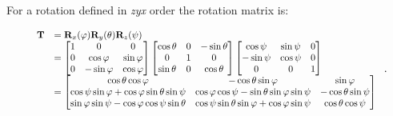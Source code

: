 \begin{enumerate}
        For a rotation defined in \textit{zyx} order the rotation matrix is:

        \begin{equation}
            \scalebox{0.85}{
                $ \begin{array}{ll}
                    \mathbf{T}
                    &= \mathbf{R}_{x}(\varphi)\mathbf{R}_{y}(\theta)\mathbf{R}_{z}(\psi) \\
                    &=
                    \begin{bmatrix}
                        1 & 0 & 0 \\
                        0 & \cos \varphi & \sin \varphi \\
                        0 & -\sin \varphi & \cos \varphi
                    \end{bmatrix}
                    \begin{bmatrix}
                        \cos \theta & 0 & -\sin \theta \\
                        0 & 1 & 0 \\
                        \sin \theta & 0 & \cos \theta
                    \end{bmatrix}
                    \begin{bmatrix}
                        \cos \psi & \sin \psi & 0 \\
                        -\sin \psi & \cos \psi & 0 \\
                        0 & 0 & 1
                    \end{bmatrix} \\
                    &=
                    \begin{bmatrix}
                        \cos \theta \cos \varphi
                        & - \cos \theta \sin \varphi
                        & \sin \varphi \\
                        \cos \psi \sin \varphi + \cos \varphi \sin \theta \sin \psi
                        & \cos \varphi \cos \psi - \sin \theta \sin \varphi \sin \psi
                        & -\cos \theta \sin \psi \\
                        \sin \varphi \sin \psi - \cos \varphi \cos \psi \sin \theta
                        & \cos \psi \sin \theta \sin \varphi + \cos \varphi \sin \psi
                        & \cos \theta \cos \psi
                    \end{bmatrix}
                \end{array} $
            }
        .\end{equation}


\end{enumerate}
